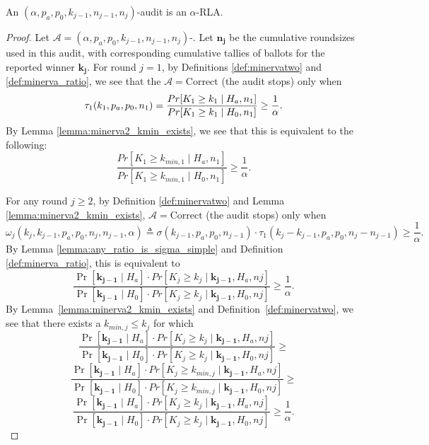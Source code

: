\begin{theorem}
\label{thm:minerva2_is_rla_new}
An $(\alpha,p_a, p_0,k_{j-1},n_{j-1},n_j)$-\Providence audit is an
$\alpha$-RLA.
\end{theorem}
\begin{proof}
Let $\mathcal{A}=(\alpha,p_a, p_0,k_{j-1},n_{j-1},n_j)$-\Providence.
Let $\bm{n_j}$ be the cumulative roundsizes used in this
audit, with corresponding cumulative tallies of
ballots for the reported winner $\bm{k_j}$.
For round $j=1$, by Definitions \ref{def:minervatwo}
and \ref{def:minerva_ratio}, we see that
the $\mathcal{A}=\text{Correct}$ (the audit stops) only when
$$
\tau_1(k_{1},p_a,p_0,n_1)\\
=\frac{Pr[K_{1} \geq k_{1} \mid H_a, n_1]}{Pr[K_{1} \geq k_{1} \mid H_0, n_1]}
\ge \frac{1}{\alpha}.
$$
By Lemma \ref{lemma:minerva2_kmin_exists}, we see that this
is equivalent to the following:
$$
\frac{Pr[K_{1} \geq k_{min,1} \mid H_a, n_1]}{Pr[K_{1} \geq k_{min, 1} \mid H_0, n_1]}
\ge \frac{1}{\alpha}.
$$

For any round $j\ge 2$, by Definition \ref{def:minervatwo}
and Lemma \ref{lemma:minerva2_kmin_exists},
$\mathcal{A}=\text{Correct}$ (the audit stops) only when
$$
\omega_{j}(k_{j}, k_{j-1}, p_a, p_0, n_{j}, n_{j-1}, \alpha )\triangleq
\sigma(k_{j-1},p_a,p_0,n_{j-1})\cdot \tau_1(k_{j}-k_{j-1},p_a,p_0,n_j-n_{j-1})
\ge \frac{1}{\alpha}.
$$
By Lemma \ref{lemma:any_ratio_is_sigma_simple}
and Definition \ref{def:minerva_ratio}, this is equivalent to
$$
\frac{\Pr[\bm{k_{j-1}} \mid H_a]\cdot Pr[K_{j} \ge k_{j} \mid \bm{k_{j-1}}, H_a, n{j}]}{\Pr[\bm{k_{j-1}} \mid H_0]\cdot Pr[K_{j} \ge k_{j} \mid \bm{k_{j-1}}, H_0, n{j}]}\ge \frac{1}{\alpha}.
$$
By Lemma~\ref{lemma:minerva2_kmin_exists} and Definition~\ref{def:minervatwo},
we see that there exists a $k_{min, j}\le k_j$ for which
$$
\frac{\Pr[\bm{k_{j-1}} \mid H_a]\cdot Pr[K_{j} \ge k_{j} \mid \bm{k_{j-1}}, H_a, n{j}]}{\Pr[\bm{k_{j-1}} \mid H_0]\cdot Pr[K_{j} \ge k_{j} \mid \bm{k_{j-1}}, H_0, n{j}]}\ge
$$
$$
\frac{\Pr[\bm{k_{j-1}} \mid H_a]\cdot Pr[K_{j} \ge k_{min, j} \mid \bm{k_{j-1}}, H_a, n{j}]}{\Pr[\bm{k_{j-1}} \mid H_0]\cdot Pr[K_{j} \ge k_{min, j} \mid \bm{k_{j-1}}, H_0, n{j}]} \ge 
$$
$$
\frac{\Pr[\bm{k_{j-1}} \mid H_a]\cdot Pr[K_{j} \ge k_{j} \mid \bm{k_{j-1}}, H_a, n{j}]}{\Pr[\bm{k_{j-1}} \mid H_0]\cdot Pr[K_{j} \ge k_{j} \mid \bm{k_{j-1}}, H_0, n{j}]}\ge \frac{1}{\alpha}.
$$


\end{proof}
